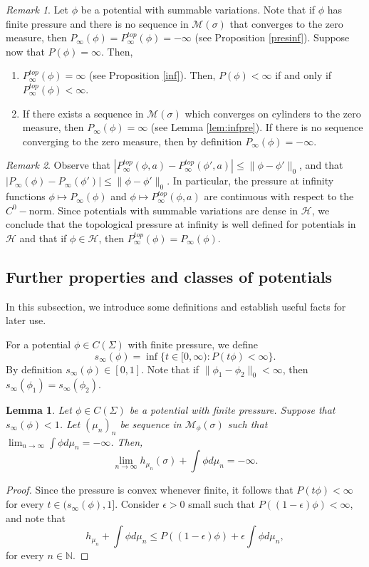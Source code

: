 \documentclass[letterpaper,11pt]{amsart}
\theoremstyle{plain}
\theoremstyle{plain}
\newtheorem{lemma}[proposition]{Lemma}
\theoremstyle{definition}
\theoremstyle{remark}
\newtheorem{remark}{Remark}[section]
\def\N{{\mathbb N}}
\def\M{{\mathcal M}}
\def\H{{\mathcal H}}
\begin{document}
\begin{remark}\label{rem:inf} Let $\phi$ be a potential with summable variations. Note that if $\phi$ has finite pressure and there is no sequence in $\M(\sigma)$ that converges to the zero measure, then $P_\infty(\phi)=P^{top}_\infty(\phi)=-\infty$ (see Proposition \ref{presinf}). Suppose now that $P(\phi)=\infty$. Then,
\begin{enumerate}
\item $P^{top}_\infty(\phi)=\infty$ (see Proposition \ref{inf}). Then, $P(\phi)<\infty$ if and only if $P_\infty^{top}(\phi)<\infty$.
\item If there exists a sequence in $\M(\sigma)$ which converges on cylinders to the zero measure,  then $P_\infty(\phi)=\infty$ (see Lemma \ref{lem:infpre}). If there is no sequence converging to the zero measure, then by definition $P_\infty(\phi)=-\infty$.
\end{enumerate}
\end{remark}

\begin{remark}\label{rem:Hinfty}
Observe  that $|P_\infty^{top}(\phi,a)-P_\infty^{top}(\phi',a)|\le \|\phi-\phi'\|_0$, and that $|P_\infty(\phi)-P_\infty(\phi')|\le \|\phi-\phi'\|_0$. In particular, the pressure at infinity functions $\phi\mapsto P_\infty(\phi)$ and $\phi\mapsto P_\infty^{top}(\phi,a)$ are continuous with respect to the $C^0-$norm. Since potentials with summable variations are dense in $\H$, we conclude that the topological  pressure at infinity is well defined for potentials in $\H$ and that if $\phi\in\H$, then $P_\infty^{top}(\phi)=P_\infty(\phi)$.
\end{remark}



\subsection{Further properties and classes of potentials}\label{sec:phi} In this subsection, we introduce some definitions and establish useful facts for later use.

 For a potential $\phi \in C(\Sigma)$ with finite pressure, we define $$s_\infty(\phi )=\inf\{t\in [0,\infty):P(t\phi )<\infty\}.$$
By definition $s_\infty(\phi)\in [0,1]$. Note that if $\|\phi_1-\phi_2\|_0<\infty$, then $s_\infty(\phi_1)=s_\infty(\phi_2)$. 

\begin{lemma}\label{lem:-inf} Let $\phi\in C(\Sigma)$ be a potential with finite pressure. Suppose that $s_\infty(\phi)<1$. 
Let $(\mu_n)_n$ be sequence in $\M_\phi(\sigma)$ such that $\lim_{n\to\infty}\int \phi d\mu_n=-\infty$. Then, $$\lim_{n\to\infty}h_{\mu_n}(\sigma)+\int \phi d\mu_n=-\infty.$$
\end{lemma}
\begin{proof} Since the pressure is convex whenever finite, it follows that $P(t\phi)<\infty$ for every $t\in (s_\infty(\phi),1]$. Consider $\epsilon>0$ small such that $P((1-\epsilon)\phi)<\infty$, and note that $$h_{\mu_n}+\int \phi d\mu_n\le P((1-\epsilon)\phi)+\epsilon\int\phi d\mu_n,$$
for every $n\in\N$.
\end{proof}
\end{document}
